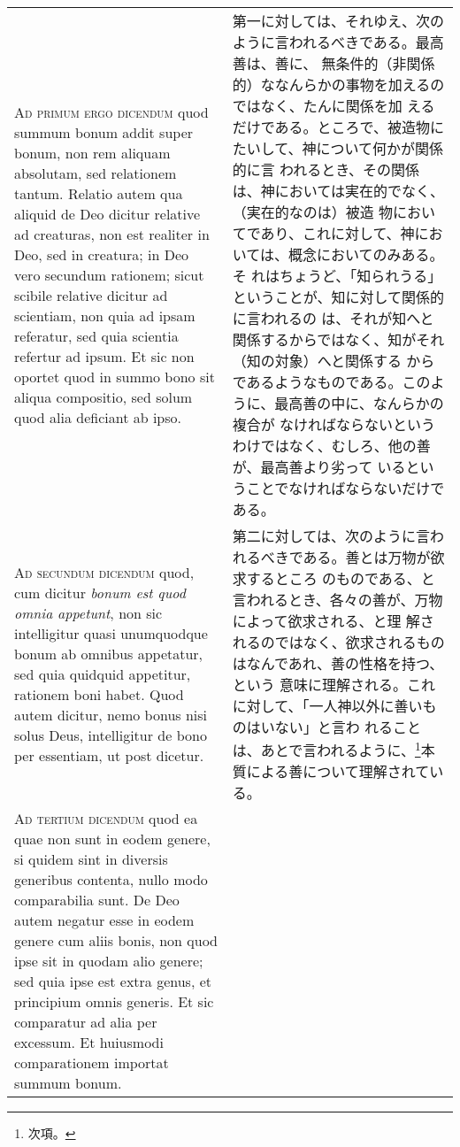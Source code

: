 \documentclass[10pt]{jsarticle} %
\begin{document}
\begin{longtable}{p{21em}p{21em}}
\\


{\scshape Ad primum ergo dicendum} quod summum bonum addit super bonum, non rem
 aliquam absolutam, sed relationem tantum. Relatio autem qua aliquid de
 Deo dicitur relative ad creaturas, non est realiter in Deo, sed in
 creatura; in Deo vero secundum rationem; sicut scibile relative dicitur
 ad scientiam, non quia ad ipsam referatur, sed quia scientia refertur
 ad ipsum. Et sic non oportet quod in summo bono sit aliqua compositio,
 sed solum quod alia deficiant ab ipso.

&


第一に対しては、それゆえ、次のように言われるべきである。最高善は、善に、
 無条件的（非関係的）ななんらかの事物を加えるのではなく、たんに関係を加
 えるだけである。ところで、被造物にたいして、神について何かが関係的に言
 われるとき、その関係は、神においては実在的でなく、（実在的なのは）被造
 物においてであり、これに対して、神においては、概念においてのみある。そ
 れはちょうど、「知られうる」ということが、知に対して関係的に言われるの
 は、それが知へと関係するからではなく、知がそれ（知の対象）へと関係する
 からであるようなものである。このように、最高善の中に、なんらかの複合が
 なければならないというわけではなく、むしろ、他の善が、最高善より劣って
 いるということでなければならないだけである。

\\

{\scshape Ad secundum dicendum} quod, cum dicitur {\itshape bonum est quod omnia appetunt},
 non sic intelligitur quasi unumquodque bonum ab omnibus appetatur, sed
 quia quidquid appetitur, rationem boni habet. Quod autem dicitur, nemo
 bonus nisi solus Deus, intelligitur de bono per essentiam, ut post
 dicetur.

&

第二に対しては、次のように言われるべきである。善とは万物が欲求するところ
 のものである、と言われるとき、各々の善が、万物によって欲求される、と理
 解されるのではなく、欲求されるものはなんであれ、善の性格を持つ、という
 意味に理解される。これに対して、「一人神以外に善いものはいない」と言わ
 れることは、あとで言われるように、\footnote{次項。}本質による善について理解されている。


\\

{\scshape Ad tertium dicendum} quod ea quae non sunt in eodem genere, si quidem
 sint in diversis generibus contenta, nullo modo comparabilia sunt. De
 Deo autem negatur esse in eodem genere cum aliis bonis, non quod ipse
 sit in quodam alio genere; sed quia ipse est extra genus, et principium
 omnis generis. Et sic comparatur ad alia per excessum. Et huiusmodi
 comparationem importat summum bonum.


\end{longtable}
\end{document}
